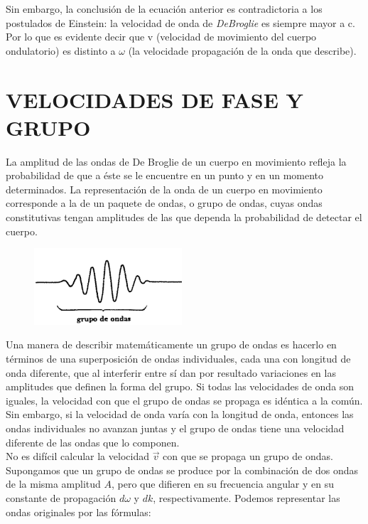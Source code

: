 \documentclass[a4paper]{article}
\begin{document}
    \indent Sin embargo, la conclusión de la ecuación anterior es contradictoria a los postulados de Einstein: la velocidad de onda de \textit{DeBroglie} es siempre mayor a c. Por lo que es evidente decir que v (velocidad de movimiento del cuerpo ondulatorio) es distinto a $\omega$ (la velocidade propagación de la onda que describe). \\

\newpage
\noindent
\thispagestyle{fancy}

\section{VELOCIDADES DE FASE Y GRUPO}
    \indent La amplitud de las ondas de De Broglie de un cuerpo en movimiento refleja la probabilidad de que a éste se le encuentre en un punto y en un momento determinados. La representación de la onda de un cuerpo en movimiento corresponde a la de un paquete de ondas, o grupo de ondas, cuyas ondas constitutivas tengan amplitudes de las que dependa la probabilidad de detectar el cuerpo.\\

    \begin{figure}[h!]
        \centering
        \includegraphics[width = 5.5cm]{../imagenes/grupoDeOndas.png}
    \end{figure}

    \indent Una manera de describir matemáticamente un grupo de ondas es hacerlo en términos de una superposición de ondas individuales, cada una con longitud de onda diferente, que al interferir entre sí dan por resultado variaciones en las amplitudes que definen la forma del grupo. Si todas las velocidades de onda son iguales, la velocidad con que el grupo de ondas se propaga es idéntica a la común. Sin embargo, si la velocidad de onda varía con la longitud de onda, entonces las ondas individuales no avanzan juntas y el grupo de ondas tiene una velocidad diferente de las ondas que lo componen.\\

    \indent No es difícil calcular la velocidad $\vec{v}$ con que se propaga un grupo de ondas. Supongamos que un grupo de ondas se produce por la combinación de dos ondas de la misma amplitud $A$, pero que difieren en su frecuencia angular y en su constante de propagación $d\omega$  y $dk$, respectivamente. Podemos representar las ondas originales por las fórmulas:
\end{document}
